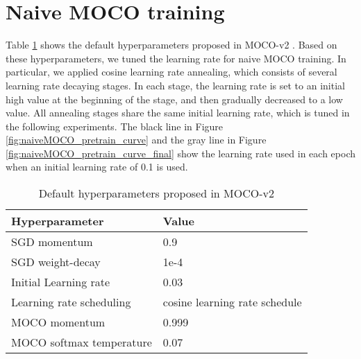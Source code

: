 \documentclass[12pt,twoside]{report}
\begin{document}


\section{Naive MOCO training} \label{sec:naiveMOCO_eval}
Table \ref{tab:naive_moco_hyperparameters} shows the default hyperparameters proposed in MOCO-v2 \cite{mocov2}. Based on these hyperparameters, we tuned the learning rate for naive MOCO training. In particular, we applied cosine learning rate annealing, which consists of several learning rate decaying stages. In each stage, the learning rate is set to an initial high value at the beginning of the stage, and then gradually decreased to a low value. All annealing stages share the same initial learning rate, which is tuned in the following experiments. The black line in Figure \ref{fig:naiveMOCO_pretrain_curve} and the gray line in Figure \ref{fig:naiveMOCO_pretrain_curve_final} show the learning rate used in each epoch when an initial learning rate of 0.1 is used. \\

\begin{table}[]
    \centering
    \begin{tabular}{ll}
    \toprule
    Hyperparameter & Value \\
    \midrule
    SGD momentum & 0.9 \\
    SGD weight-decay & 1e-4 \\
    Initial Learning rate & 0.03 \\
    Learning rate scheduling & cosine learning rate schedule \\
    MOCO momentum & 0.999 \\
    MOCO softmax temperature & 0.07 \\
    \bottomrule
    \end{tabular}
    \caption{Default hyperparameters proposed in MOCO-v2}
    \label{tab:naive_moco_hyperparameters}
\end{table}
\end{document}
